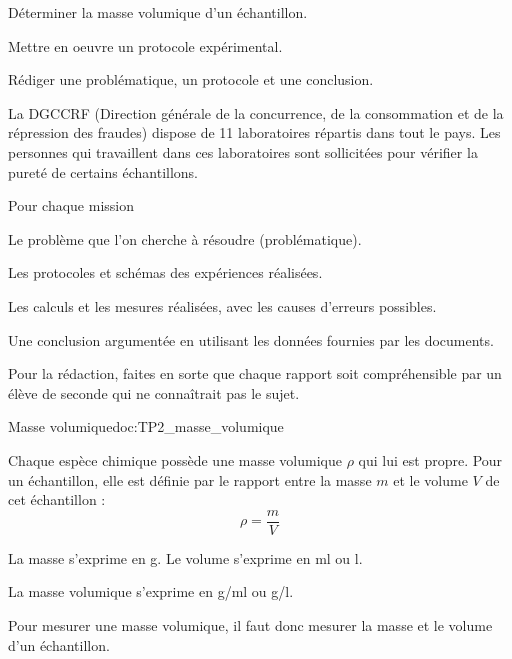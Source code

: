 \teteSndCorp




\begin{objectifs}
  \item Déterminer la masse volumique d'un échantillon.
  \item Mettre en oeuvre un protocole expérimental.
  \item Rédiger une problématique, un protocole et une conclusion.
\end{objectifs}


\begin{contexte}
  La \textsf{DGCCRF} (Direction générale de la concurrence, de la consommation et de la répression des fraudes) dispose de 11 laboratoires répartis dans tout le pays. 
  Les personnes qui travaillent dans ces laboratoires sont sollicitées pour vérifier la pureté de certains échantillons.
\end{contexte}

{\large \fleche {}}

Pour chaque mission 
\begin{listePoints}
  \item Le problème que l'on cherche à résoudre (problématique).
  \item Les protocoles et schémas des expériences réalisées.
  \item Les calculs et les mesures réalisées, avec les causes d'erreurs possibles.
  \item Une conclusion argumentée en utilisant les données fournies par les documents.
\end{listePoints}

\flecheLongue Pour la rédaction, faites en sorte que chaque rapport soit compréhensible par un élève de seconde qui ne connaîtrait pas le sujet.


\begin{doc}{Masse volumique}{doc:TP2_masse_volumique}
  \begin{importants}
    Chaque espèce chimique possède une masse volumique $\rho$ qui lui est propre.
    Pour un échantillon, elle est définie par le rapport entre la masse $m$ et le volume $V$ de cet échantillon : 
    \begin{equation*}
      \rho = \dfrac{m}{V}
    \end{equation*}
  \end{importants}
  
  \begin{listePoints}
    \item La masse s'exprime en \unit{\g}.
    Le volume s'exprime en \unit{\ml} ou \unit{\litre}.
    \item La masse volumique s'exprime en \unit{\g/\ml} ou \unit{\g/\litre}.
  \end{listePoints}
  Pour mesurer une masse volumique, il faut donc mesurer la masse et le volume d'un échantillon.
\end{doc}

